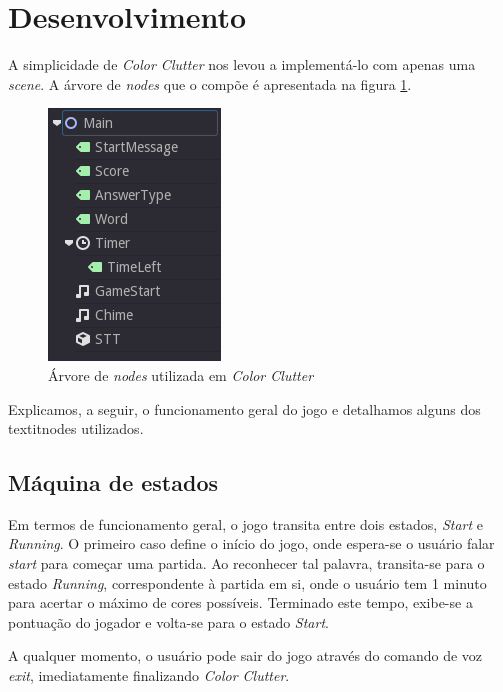 
\section{Desenvolvimento}

A simplicidade de \textit{Color Clutter} nos levou a implementá-lo com apenas uma \textit{scene}. A árvore de \textit{nodes} que o compõe é apresentada na figura \ref{color-clutter-nodes}.

\begin{figure}[H]
  \centering
  \includegraphics[width=.3\textwidth]{image/color-clutter-nodes}
  \caption{Árvore de \textit{nodes} utilizada em \textit{Color Clutter}}
  \label{color-clutter-nodes}
\end{figure}

Explicamos, a seguir, o funcionamento geral do jogo e detalhamos alguns dos textit{nodes} utilizados.


\subsection{Máquina de estados}

Em termos de funcionamento geral, o jogo transita entre dois estados, \textit{Start} e \textit{Running}. O primeiro caso define o início do jogo, onde espera-se o usuário falar \textit{start} para começar uma partida. Ao reconhecer tal palavra, transita-se para o estado \textit{Running}, correspondente à partida em si, onde o usuário tem 1 minuto para acertar o máximo de cores possíveis. Terminado este tempo, exibe-se a pontuação do jogador e volta-se para o estado \textit{Start}.

A qualquer momento, o usuário pode sair do jogo através do comando de voz \textit{exit}, imediatamente finalizando \textit{Color Clutter}.

